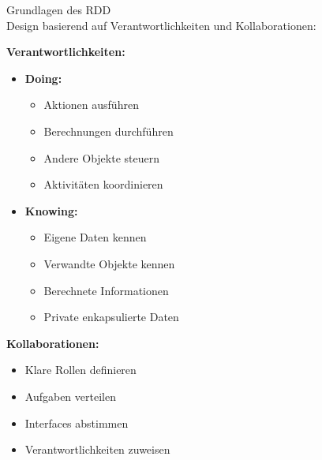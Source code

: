 \begin{concept}{Grundlagen des RDD}\\
Design basierend auf Verantwortlichkeiten und Kollaborationen:

\textbf{Verantwortlichkeiten:}
\begin{itemize}
    \item \textbf{Doing:}
    \begin{itemize}
        \item Aktionen ausführen
        \item Berechnungen durchführen
        \item Andere Objekte steuern
        \item Aktivitäten koordinieren
    \end{itemize}
    
    \item \textbf{Knowing:}
    \begin{itemize}
        \item Eigene Daten kennen
        \item Verwandte Objekte kennen
        \item Berechnete Informationen
        \item Private enkapsulierte Daten
    \end{itemize}
\end{itemize}

\textbf{Kollaborationen:}
\begin{itemize}
    \item Klare Rollen definieren
    \item Aufgaben verteilen
    \item Interfaces abstimmen
    \item Verantwortlichkeiten zuweisen
\end{itemize}
\end{concept}

